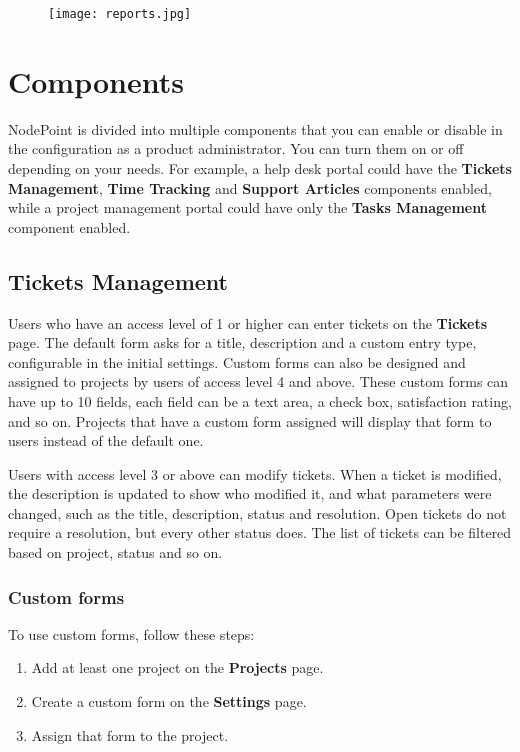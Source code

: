 \documentclass[11pt]{article}
\begin{document}
\begin{figure}[h]
\texttt{[image: reports.jpg]}
\end{figure}

\clearpage
\section{Components}
NodePoint is divided into multiple components that you can enable or disable in the configuration as a product administrator. You can turn them on or off depending on your needs. For example, a help desk portal could have the \textbf{Tickets Management}, \textbf{Time Tracking} and \textbf{Support Articles} components enabled, while a project management portal could have only the \textbf{Tasks Management} component enabled.

\subsection{Tickets Management}
Users who have an access level of 1 or higher can enter tickets on the \textbf{Tickets} page. The default form asks for a title, description and a custom entry type, configurable in the initial settings. Custom forms can also be designed and assigned to projects by users of access level 4 and above. These custom forms can have up to 10 fields, each field can be a text area, a check box, satisfaction rating, and so on. Projects that have a custom form assigned will display that form to users instead of the default one.

Users with access level 3 or above can modify tickets. When a ticket is modified, the description is updated to show who modified it, and what parameters were changed, such as the title, description, status and resolution. Open tickets do not require a resolution, but every other status does. The list of tickets can be filtered based on project, status and so on.

\subsubsection{Custom forms}
To use custom forms, follow these steps:

\begin{enumerate}
\item Add at least one project on the \textbf{Projects} page.
\item Create a custom form on the \textbf{Settings} page.
\item Assign that form to the project.
\end{enumerate}
\end{document}

